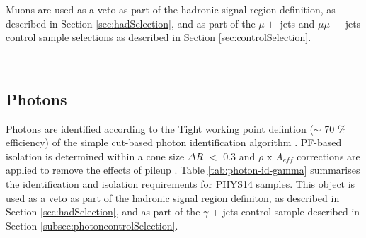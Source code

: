 Muons are used as a veto as part of the hadronic signal region definition, as described in Section \ref{sec:hadSelection}, and as part of the $\mu +$ jets and $\mu\mu +$ jets control sample selections as described in Section \ref{sec:controlSelection}.

\begin{figure}[h]
  \centering
  ~~
  ~~  
\end{figure}


\subsection{Photons}
\label{sec:photon-id}
Photons are identified according to the Tight working point defintion ($\sim$ 70 $\%$ efficiency) of the simple cut-based photon identification algorithm \cite{photon-id}. PF-based isolation is determined within a cone size $\Delta R$ $<$ 0.3 and $\rho$ x $A_{eff}$ corrections are applied to remove the effects of pileup \cite{pf-photon}. Table \ref{tab:photon-id-gamma} summarises the identification and isolation requirements for PHYS14 samples. 
This object is used as a veto as part of the hadronic signal region definiton, as described in Section \ref{sec:hadSelection}, and as part of the $\gamma$ + jets control sample described in Section \ref{subsec:photoncontrolSelection}.

